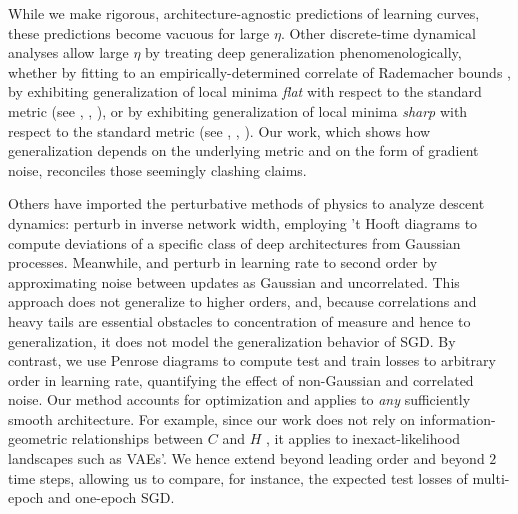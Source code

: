 \documentclass{article}
\theoremstyle{plain}
\theoremstyle{definition}
\begin{document}

    While we make rigorous, architecture-agnostic predictions of learning
    curves, these predictions become vacuous for large $\eta$. 
    Other discrete-time dynamical analyses allow large $\eta$ by treating deep
    generalization phenomenologically, whether by fitting to an
    empirically-determined correlate of Rademacher bounds \citep{li18}, by
    exhibiting generalization of local minima \emph{flat} with respect to the
    standard metric (see \citet{ho17}, \citet{ke17}, \citet{wa18}), or by
    exhibiting generalization of local minima \emph{sharp} with respect to the
    standard metric (see \citet{st56}, \citet{di17}, \citet{wu18}).  Our work,
    which shows how generalization depends on the underlying
    metric and on the form of gradient noise, reconciles those
    seemingly clashing claims.
    

    Others have imported the perturbative methods of physics to analyze descent
    dynamics:  \citet{dy19} perturb in inverse network width, employing 't
    Hooft diagrams to compute deviations of a specific class of deep
    architectures from Gaussian processes.  Meanwhile, \cite{ch18} and
    \citet{li17} perturb in learning rate to second order by approximating
    noise between updates as Gaussian and uncorrelated.  This approach does not
    generalize to higher orders, and, because correlations and heavy tails are
    essential obstacles to concentration of measure and hence to
    generalization, it does not model the generalization behavior of SGD.  By
    contrast, we use Penrose diagrams to compute test and train losses to
    arbitrary order in learning rate, quantifying the effect of non-Gaussian
    and correlated noise.  Our method accounts for optimization and applies to
    \emph{any} sufficiently smooth architecture.  For example, since our work
    does not rely on information-geometric relationships between $C$ and $H$
    \citep{am98, ro12}, it applies to inexact-likelihood landscapes such as
    VAEs'.  We hence extend \citet{ro18} beyond leading order and beyond $2$
    time steps, allowing us to compare, for instance, the expected test losses
    of multi-epoch and one-epoch SGD.
\end{document}
